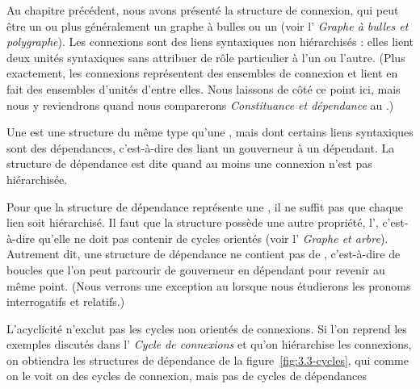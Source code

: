 Au chapitre précédent, nous avons présenté la structure de connexion, qui peut être un  ou plus généralement un graphe à bulles ou un  (voir l’ \textit{Graphe à bulles et polygraphe}). Les connexions sont des liens syntaxiques non hiérarchisés : elles lient deux unités syntaxiques sans attribuer de rôle particulier à l’un ou l’autre. (Plus exactement, les connexions représentent des ensembles de connexion et lient en fait des ensembles d'unités d'entre elles. Nous laissons de côté ce point ici, mais nous y reviendrons quand nous comparerons \textit{Constituance et dépendance} au .)

{Une  est une structure du même type qu’une , mais dont certains liens syntaxiques sont des dépendances, c’est-à-dire des  liant un gouverneur à un dépendant. La structure de dépendance est dite  quand au moins une connexion n’est pas hiérarchisée.}

Pour que la structure de dépendance représente une , il ne suffit pas que chaque lien soit hiérarchisé. Il faut que la structure possède une autre propriété, l’, c’est-à-dire qu’elle ne doit pas contenir de cycles orientés (voir l’ \textit{Graphe et arbre}). Autrement dit, une structure de dépendance ne contient pas de , c’est-à-dire de boucles que l’on peut parcourir de gouverneur en dépendant pour revenir au même point. (Nous verrons une exception au  lorsque nous étudierons les pronoms interrogatifs et relatifs.)

L’acyclicité n’exclut pas les cycles non orientés de connexions. Si l'on reprend les exemples discutés dans l’ \textit{Cycle de connexions} et qu'on hiérarchise les connexions, on obtiendra les structures de dépendance de la figure~\ref{fig:3.3-cycles}, qui comme on le voit on des cycles de connexion, mais pas de cycles de dépendances

